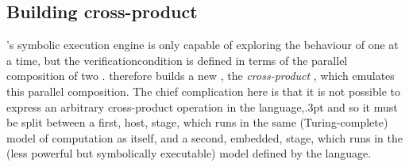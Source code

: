 \subsection{Building cross-product {\StateMachines}}
\label{sect:using:build_cross_product}

{\Technique}'s symbolic execution engine is only capable of exploring
the behaviour of one {\StateMachine} at a time, but the
\gls{verificationcondition} is defined in terms of the parallel
composition of two {\StateMachines}.  {\Technique} therefore builds a
new {\StateMachine}, the \emph{cross-product {\StateMachine}}, which
emulates this parallel composition.  The chief complication here is
that it is not possible to express an arbitrary cross-product
operation in the {\StateMachine} language,\kern.3pt and so it must be split between a
first, host, stage, which runs in the same (Turing-complete) model of
computation as {\technique} itself, and a second, embedded, stage,
which runs in the (less powerful but symbolically executable) model
defined by the {\StateMachine} language.

